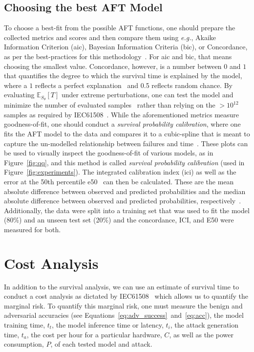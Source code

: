 \documentclass[sn-mathphys-num]{sn-jnl}%
\begin{document}
\subsection{Choosing the best AFT Model}
\label{best-fit}
To choose a best-fit from the possible AFT functions, one should prepare the collected metrics and scores and then compare them using \textit{e.g.}, Akaike Information Criterion (\acrshort{aic}), Bayesian Information Criteria (\acrshort{bic}), or Concordance, as per the best-practices for this methodology~\cite{aft_models,kleinbaum1996survival}.
For \acrshort{aic} and \acrshort{bic}, that means choosing the smallest value. Concordance, however, is a number between $0$ and $1$ that quantifies the degree to which the survival time is explained by the model, where a $1$ reflects a perfect explanation~\cite{kleinbaum1996survival} and 0.5 reflects random chance. By evaluating $\mathbb{E}_{S_\theta}[T]$ under extreme perturbations, one can test the model and minimize the number of evaluated samples~\cite{aft_models,kleinbaum1996survival} rather than relying on the $> 10^{12}$ samples as required by IEC61508~\cite{IEC61508}.
While the aforementioned metrics measure goodness-of-fit, one should conduct a \textit{survival probability calibration}, where one fits the AFT model to the data and compares it to a cubic-spline that is meant to capture the un-modelled relationship between failures and time~\cite{ici}. These plots can be used to visually inspect the goodness-of-fit of various models, as in Figure~\ref{fig:qq}, and this method is called \textit{survival probability calibration} (used in Figure~\ref{fig:experiments}).
The integrated calibration index (\acrshort{ici}) as well as the error at the 50th percentile \acrshort{e50}~\cite{ici} can then be calculated.
These are the mean absolute difference between observed and predicted probabilities and the median absolute difference between observed and predicted probabilities, respectively~\cite{ici}.
Additionally, the data were split into a training set that was used to fit the model (80\%) and an unseen test set (20\%) and the concordance, ICI, and E50 were measured for both.






\section{Cost Analysis}
\label{cost}

In addition to the survival analysis, we can use an estimate of survival time to conduct a cost analysis as dictated by IEC61508~\cite{IEC61508} which allows us to quantify the marginal risk. To quantify this marginal risk, one must measure the benign and adversarial accuracies (see Equations~\ref{eq:adv_success}~and~\ref{eq:acc}), the model training time, $t_{t}$, the model inference time or latency, $t_{i}$, the attack generation time, $t_{a}$, the cost per hour for a particular hardware, $C$, as well as the power consumption, $P$, of each tested model and attack.
\end{document}
